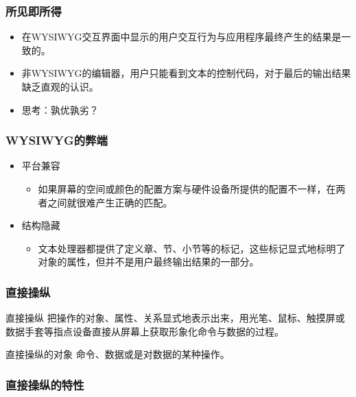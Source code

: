 \documentclass{beamer}
\newcommand{\fullPageImage}[2]{
	{
		\usebackgroundtemplate{\texttt{[image: \#1]}}
		\frame[plain]{#2}
	}
}
\begin{document}
\fullPageImage{images/RedconsFullPreview1-600x356.png}{\transwipe}

\begin{frame}
	\frametitle{所见即所得}
	\beamertemplatetransparentcovereddynamicmedium
	\begin{itemize}[<+->]
		\item 在WYSIWYG交互界面中显示的用户交互行为与应用程序最终产生的结果是一致的。 
		\item 非WYSIWYG的编辑器，用户只能看到文本的控制代码，对于最后的输出结果缺乏直观的认识。
		\item 思考：孰优孰劣？
	\end{itemize}
\end{frame}

\begin{frame}
	\frametitle{WYSIWYG的弊端}
	\begin{itemize}[<+->]
		\item 平台兼容
		\begin{itemize}
			\item 如果屏幕的空间或颜色的配置方案与硬件设备所提供的配置不一样，在两者之间就很难产生正确的匹配。
		\end{itemize}
		\item 结构隐藏
		\begin{itemize}
			\item 文本处理器都提供了定义章、节、小节等的标记，这些标记显式地标明了对象的属性，但并不是用户最终输出结果的一部分。
		\end{itemize}
	\end{itemize}
\end{frame}

\begin{frame}
	\frametitle{直接操纵}
	\beamertemplatetransparentcovereddynamicmedium
	\begin{beamerboxesrounded}[shadow=true]{直接操纵}
	把操作的对象、属性、关系显式地表示出来，用光笔、鼠标、触摸屏或数据手套等指点设备直接从屏幕上获取形象化命令与数据的过程。
	\end{beamerboxesrounded}
	\pause
	\begin{beamerboxesrounded}[shadow=true]{直接操纵的对象}
	命令、数据或是对数据的某种操作。
	\end{beamerboxesrounded}
\end{frame}

\begin{frame}
	\frametitle{直接操纵的特性}

\end{frame}
\end{document}
